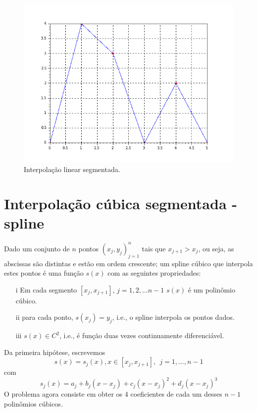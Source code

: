 \begin{figure}[htp]
\begin{center}
\includegraphics[scale=0.5]{./cap_aproxfun/pics/interpolacao_linear_segmentada.png}
\caption{Interpolação linear segmentada.}
\label{fig:linear_segmentada}
\end{center}
\end{figure}


\section{Interpolação cúbica segmentada - spline}
Dado um conjunto de $n$ pontos $\left(x_j,y_j\right)_{j=1}^n$ tais que $x_{j+1}>x_j$, ou seja, as abscissas são distintas e estão em ordem crescente; um spline cúbico que interpola estes pontos é uma função $s(x)$ com as seguintes propriedades:
\begin{itemize}
\item[i] Em cada segmento $[x_j,x_{j+1}]$, $j=1,2,\ldots n-1$ $s(x)$ é um polinômio cúbico.
\item[ii] para cada ponto, $s(x_j)=y_j$, i.e., o spline interpola os pontos dados.
\item[iii] $s(x)\in C^2$, i.e., é função duas vezes continuamente diferenciável.
\end{itemize}

Da primeira hipótese, escrevemos
$$s(x)=s_j(x),x \in [x_j,x_{j+1}],~~ j=1,\ldots, n-1$$
com
$$s_j(x)=a_j+b_j(x-x_j)+c_j(x-x_j)^2+d_j(x-x_j)^3$$
O problema agora consiste em obter os 4 coeficientes de cada um desses $n-1$ polinômios cúbicos.

